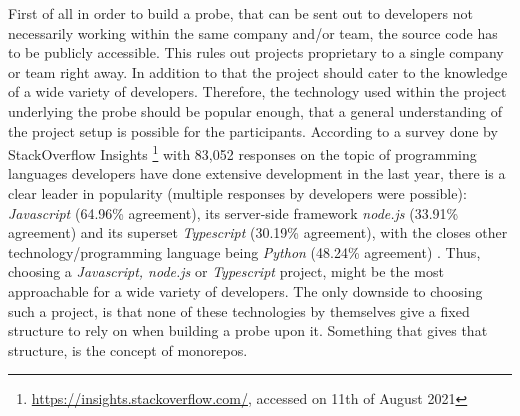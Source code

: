 First of all in order to build a probe, that can be sent out to developers not necessarily working within the same company and/or team, the source code has to be publicly accessible. This rules out projects proprietary to a single company or team right away. In addition to that the project should cater to the knowledge of a wide variety of developers. Therefore, the technology used within the project underlying the probe should be popular enough, that a general understanding of the project setup is possible for the participants. According to a survey done by StackOverflow Insights \footnote{\url{https://insights.stackoverflow.com/}, accessed on 11th of August 2021} with 83,052 responses on the topic of programming languages developers have done extensive development in the last year, there is a clear leader in popularity (multiple responses by developers were possible): \textit{Javascript} (64.96\% agreement), its server-side framework \textit{node.js} (33.91\% agreement) and its superset \textit{Typescript} (30.19\% agreement), with the closes other technology/programming language being \textit{Python} (48.24\% agreement) \cite{so2021}. Thus, choosing a \textit{Javascript, node.js} or \textit{Typescript} project, might be the most approachable for a wide variety of developers. The only downside to choosing such a project, is that none of these technologies by themselves give a fixed structure to rely on when building a probe upon it. Something that gives that structure, is the concept of monorepos.

